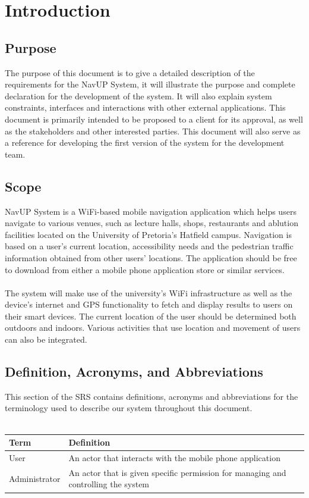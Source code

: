 \documentclass[english]{article}
\begin{document}
	\tableofcontents
	\newpage

	

	\section{Introduction}
			

		\subsection{Purpose}
			The purpose of this document is to give a detailed description of the requirements for the NavUP System, it  will illustrate the purpose and complete declaration for the development of the system. It will also explain system constraints, interfaces and interactions with other external applications. This document is primarily intended to be proposed to a client for its approval, as well as the stakeholders and other interested parties. This document  will also serve as a reference for developing the first version of the system for the development team.

		\subsection{Scope}
			NavUP System is a WiFi-based mobile navigation application which helps users navigate to various venues, such as lecture halls, shops, restaurants and ablution facilities located on the University of Pretoria's Hatfield campus. Navigation is based on a user’s current location, accessibility needs and the pedestrian traffic information obtained from other users' locations. The application should be free to download from either a mobile phone application store or similar services.\\
			\\
			The system will make use of the university's WiFi infrastructure as well as the device's internet and GPS functionality to fetch and display results to users on their smart devices. The current location of the user should be determined both outdoors and indoors. Various activities that use location and movement of users can also be integrated.

		\subsection{Definition, Acronyms, and Abbreviations}
				This section of the SRS contains definitions, acronyms and abbreviations for the terminology used to describe our system throughout this document.
				\\
				\\
				\begin{tabular}{ |p{3cm}|p{9cm}|  }
				\hline
				\textbf{Term} & \textbf{Definition}\\
				\hline
				User & An actor that interacts with the mobile phone application \\
				\hline
				Administrator & An actor that is given specific permission for managing and controlling the system\\
				\hline
				\end{tabular}
\end{document}
